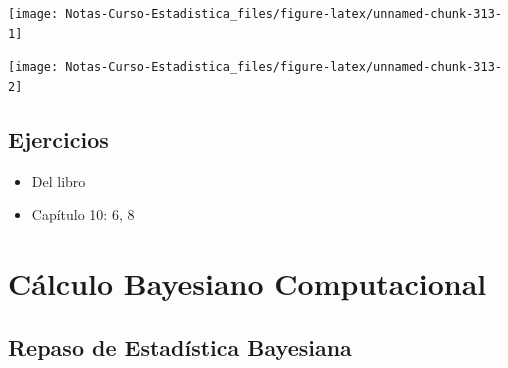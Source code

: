 \documentclass[
  12pt,
]{book}
\newenvironment{Shaded}{\begin{snugshade}}{\end{snugshade}}
\newcommand{\DecValTok}[1]{\textcolor[rgb]{0.00,0.00,0.81}{#1}}
\newcommand{\FunctionTok}[1]{\textcolor[rgb]{0.00,0.00,0.00}{#1}}
\newcommand{\NormalTok}[1]{#1}
\newcommand{\SpecialCharTok}[1]{\textcolor[rgb]{0.00,0.00,0.00}{#1}}
\providecommand{\tightlist}{%
  \setlength{\itemsep}{0pt}\setlength{\parskip}{0pt}}
\theoremstyle{definition}
\theoremstyle{definition}
\theoremstyle{definition}
\theoremstyle{definition}
\theoremstyle{remark}
\begin{document}
\begin{Shaded}
\end{Shaded}

\begin{center}\texttt{[image: Notas-Curso-Estadistica\_files/figure-latex/unnamed-chunk-313-1]} \end{center}

\begin{Shaded}
\end{Shaded}

\begin{center}\texttt{[image: Notas-Curso-Estadistica\_files/figure-latex/unnamed-chunk-313-2]} \end{center}

\hypertarget{ejercicios-6}{%
\section{Ejercicios}\label{ejercicios-6}}

\begin{itemize}
\tightlist
\item
  Del libro \autocite{James2013b}
\item
  Capítulo 10: 6, 8
\end{itemize}

\hypertarget{cuxe1lculo-bayesiano-computacional}{%
\chapter{Cálculo Bayesiano Computacional}\label{cuxe1lculo-bayesiano-computacional}}

\hypertarget{repaso-de-estaduxedstica-bayesiana}{%
\section{Repaso de Estadística Bayesiana}\label{repaso-de-estaduxedstica-bayesiana}}
\end{document}

